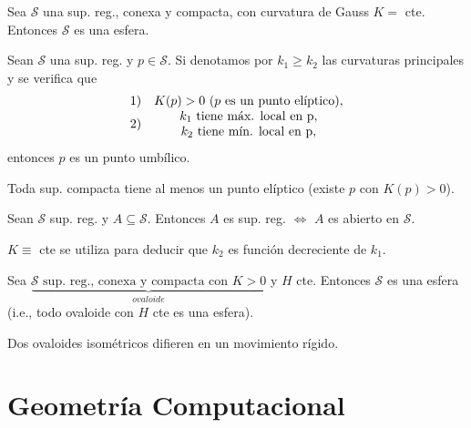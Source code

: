 \documentclass[twoside]{report}
\begin{document}
\begin{teorema}
Sea $\mathcal{S}$ una sup. reg., conexa y compacta, con curvatura de Gauss $K=$ cte. Entonces $\mathcal{S}$ es una esfera.
\end{teorema}

\begin{lemma}
Sean $\mathcal{S}$ una sup. reg. y $p \in \mathcal{S}$. Si denotamos por $k_1\geq k_2$ las curvaturas principales y se verifica que
$$
\begin{array}{l c }
1) & K(p)>0 \, \,(p\text{ es un punto elíptico}), \\
2) & {\begin{array}{c}
k_1 \,\,\text{tiene máx. local en p},\\
k_2 \,\,\text{tiene mín. local en p},
\end{array}}
\end{array}$$
entonces $p$ es un punto umbílico.
\end{lemma}

\begin{lemma}
Toda sup. compacta tiene al menos un punto elíptico (existe $p$ con $K(p)>0$).
\end{lemma}

\begin{lemma}
Sean $\mathcal{S}$ sup. reg. y $ A \subseteq \mathcal{S}$. Entonces $A$ es  sup. reg. $\Leftrightarrow$ $A$ es abierto en $\mathcal{S}$.
\end{lemma}

\begin{nota}
$K \equiv$ cte se utiliza para deducir que $k_2$ es función decreciente de $k_1$.
\end{nota}

\begin{teorema}
Sea $\underbrace{\mathcal{S} \text{ sup. reg., conexa y compacta con } K>0}_{ovaloide}$ y $H$ cte. Entonces $\mathcal{S}$ es una esfera (i.e., todo ovaloide con $H$ cte es una esfera).
\end{teorema}

\begin{teorema}
Dos ovaloides isométricos difieren en un movimiento rígido.
\end{teorema}



\chapter{Geometría Computacional}
\end{document}
